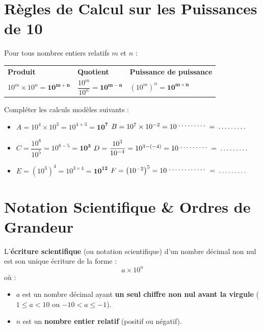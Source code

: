 \section{Règles de Calcul sur les Puissances de 10}

\begin{cadreprop}
Pour tous nombres entiers relatifs $m$ et $n$ :
\begin{center}
\renewcommand{\arraystretch}{1.8}
\begin{tabularx}{\linewidth}{X|X|X}
\rowcolor{colDefBg}
\centering \textbf{Produit} & \centering \textbf{Quotient} & \centering \textbf{Puissance de puissance} \tabularnewline
\centering $10^m \times 10^n = \mathbf{10^{m+n}}$ & \centering $\dfrac{10^m}{10^n} = \mathbf{10^{m-n}}$ & \centering $\left(10^m\right)^n = \mathbf{10^{m \times n}}$ \tabularnewline
\end{tabularx}
\end{center}
\end{cadreprop}

\begin{cadremethode}
Compléter les calculs modèles suivants :
\begin{itemize}
    \item $A = 10^4 \times 10^3 = 10^{4+3} = \mathbf{10^7}$ \hfill $B = 10^7 \times 10^{-2} = 10^{\pointille[1.5cm]} = \pointille[1.5cm]$
    \item $C = \dfrac{10^8}{10^5} = 10^{8-5} = \mathbf{10^3}$ \hfill $D = \dfrac{10^3}{10^{-4}} = 10^{3 - (-4)} = 10^{\pointille[1.5cm]} = \pointille[1.5cm]$
    \item $E = \left(10^3\right)^4 = 10^{3 \times 4} = \mathbf{10^{12}}$ \hfill $F = \left(10^{-2}\right)^5 = 10^{\pointille[2cm]} = \pointille[1.5cm]$
\end{itemize}
\end{cadremethode}

\section{Notation Scientifique \& Ordres de Grandeur}

\begin{cadredef}
L'\textbf{écriture scientifique} (ou notation scientifique) d'un nombre décimal non nul est son unique écriture de la forme :
\[ a \times 10^n \]
où :
\begin{itemize}
    \item $a$ est un nombre décimal ayant \textbf{un seul chiffre non nul avant la virgule} ($1 \leq a < 10$ ou $-10 < a \leq -1$).
    \item $n$ est un \textbf{nombre entier relatif} (positif ou négatif).
\end{itemize}
\end{cadredef}

